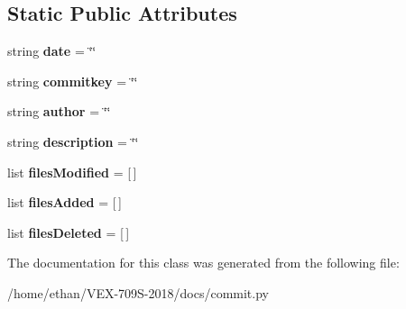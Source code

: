 \subsection*{Static Public Attributes}
\begin{DoxyCompactItemize}
\item 
\mbox{\label{classcommit_1_1Commit_ae17bc2a19f57e86ec9f97edbf5c6d92a}} 
string {\bfseries date} = \char`\"{}\char`\"{}
\item 
\mbox{\label{classcommit_1_1Commit_ad8266d0f52ea558bbebabe402789c392}} 
string {\bfseries commitkey} = \char`\"{}\char`\"{}
\item 
\mbox{\label{classcommit_1_1Commit_a81ea77c430dc4e1de39cf79bc85aea7e}} 
string {\bfseries author} = \char`\"{}\char`\"{}
\item 
\mbox{\label{classcommit_1_1Commit_a4eaa38c5a4d1ebfa4d4432a2e6879a12}} 
string {\bfseries description} = \char`\"{}\char`\"{}
\item 
\mbox{\label{classcommit_1_1Commit_a7c444414ae1a22d4a93bbcb24f962c82}} 
list {\bfseries files\+Modified} = \mbox{[}$\,$\mbox{]}
\item 
\mbox{\label{classcommit_1_1Commit_aea356b83c751276561f5fd383d7ec7fd}} 
list {\bfseries files\+Added} = \mbox{[}$\,$\mbox{]}
\item 
\mbox{\label{classcommit_1_1Commit_af8bf87dd7695ca9a3a7567da542073a5}} 
list {\bfseries files\+Deleted} = \mbox{[}$\,$\mbox{]}
\end{DoxyCompactItemize}


The documentation for this class was generated from the following file\+:\begin{DoxyCompactItemize}
\item 
/home/ethan/\+V\+E\+X-\/709\+S-\/2018/docs/commit.\+py\end{DoxyCompactItemize}
